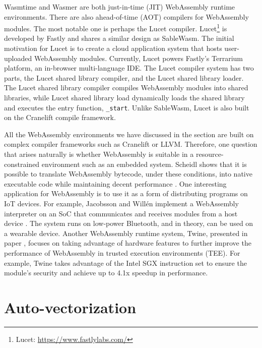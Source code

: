Wasmtime and Wasmer are both just-in-time (JIT) WebAssembly runtime environments. There are also ahead-of-time (AOT) compilers for WebAssembly modules. The most notable one is perhaps the Lucet compiler. Lucet\footnote{Lucet: \url{https://www.fastlylabs.com/}} is developed by Fastly and shares a similar design as SableWasm. The initial motivation for Lucet is to create a cloud application system that hosts user-uploaded WebAssembly modules. Currently, Lucet powers Fastly's Terrarium platform, an in-browser multi-language IDE. The Lucet compiler system has two parts, the Lucet shared library compiler, and the Lucet shared library loader. The Lucet shared library compiler compiles WebAssembly modules into shared libraries, while Lucet shared library load dynamically loads the shared library and executes the entry function, \texttt{\_start}. Unlike SableWasm, Lucet is also built on the Cranelift compile framework.

All the WebAssembly environments we have discussed in the section are built on complex compiler frameworks such as Cranelift or LLVM. Therefore, one question that arises naturally is whether WebAssembly is suitable in a resource-constrained environment such as an embedded system. Scheidl shows that it is possible to translate WebAssembly bytecode, under these conditions, into native executable code while maintaining decent performance \cite{webassembly-embedded}. One interesting application for WebAssembly is to use it as a form of distributing programs on IoT devices. For example, Jacobsson and Willén implement a WebAssembly interpreter on an SoC that communicates and receives modules from a host device \cite{webassembly-wearables}. The system runs on low-power Bluetooth, and in theory, can be used on a wearable device. Another WebAssembly runtime system, Twine, presented in paper \cite{webassembly-sgx}, focuses on taking advantage of hardware features to further improve the performance of WebAssembly in trusted execution environments (TEE). For example, Twine takes advantage of the Intel SGX instruction set to ensure the module's security and achieve up to 4.1x speedup in performance.

\section*{Auto-vectorization}

